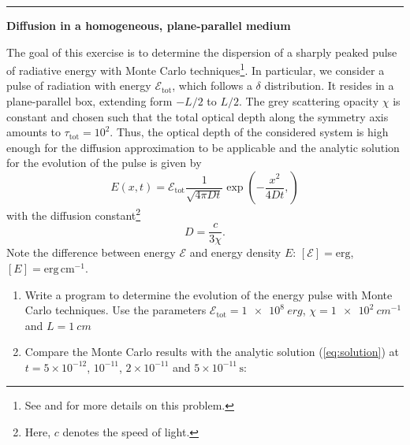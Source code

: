 \documentclass[12pt,a4paper,twoside]{article}
\begin{document}
\hrule

\textbf{Diffusion in a homogeneous, plane-parallel medium}

  The goal of this exercise is to determine the dispersion of a sharply peaked
  pulse of radiative energy with Monte Carlo techniques\footnote{See
    \citet{Noebauer2012} and \citet{Abdikamalov2012} for more details on this
  problem.}.  In particular, we consider a pulse of radiation with energy
  $\mathcal{E}_{\mathrm{tot}}$, which follows a $\delta$ distribution. It
  resides in a plane-parallel box, extending form $-L/2$ to $L/2$. The grey
  scattering opacity $\chi$ is constant and chosen such that the total optical
  depth along the symmetry axis amounts to $\tau_{\mathrm{tot}} = 10^2$. Thus,
  the optical depth of the considered system is high enough for the diffusion
  approximation to be applicable and the analytic solution for the evolution of
  the pulse is given by
  \begin{equation}
    E(x,t) = \mathcal{E}_{\mathrm{tot}} \frac{1}{\sqrt{4\pi D t}} \exp\left( -\frac{x^2}{4
    D t},
    \right)
    \label{eq:solution}
  \end{equation}
  with the diffusion constant\footnote{Here, $c$ denotes the speed of
  light.} 
  \begin{equation}
    D = \frac{c}{3 \chi}.
    \label{eq:diffusion_constant}
  \end{equation}
  Note the difference between energy $\mathcal{E}$ and energy density $E$:
  $[\mathcal{E}] = \mathrm{erg}$, $[E] = \mathrm{erg\,cm^{-1}}$.

  \begin{enumerate}
    \item Write a program to determine the evolution of the energy pulse with
      Monte Carlo techniques. Use the parameters $\mathcal{E}_{\mathrm{tot}} =
      \SI[retain-unity-mantissa=false]{1e8}{erg}$, $\chi =
      \SI[retain-unity-mantissa=false]{1e2}{cm^{-1}}$ and $L
      = \SI{1}{cm}$
    \item Compare the Monte Carlo results with the analytic solution
      (\ref{eq:solution}) at $t = 5
      \times 10^{-12}$, $10^{-11}$, $2 \times 10^{-11}$ and $5 \times 10^{-11} \,
      \mathrm{s}$:
  \end{enumerate}
\end{document}
